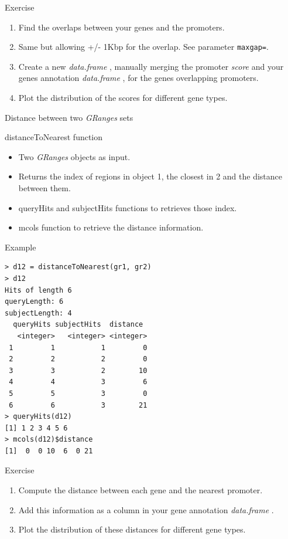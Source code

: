 \documentclass[10pt]{beamer}
\newcommand{\df}{{\it data.frame} }
\begin{document}
\begin{frame}[fragile]{Exercise}
  \begin{enumerate}
  \item Find the overlaps between your genes and the promoters.
  \item Same but allowing +/- 1Kbp for the overlap. See parameter \verb!maxgap=!.
    \bigskip
  \item Create a new \df,  manually merging the promoter {\it score} and your genes annotation \df, for the genes overlapping promoters.
  \item Plot the distribution of the scores for different gene types.
  \end{enumerate}
\end{frame}


\begin{frame}[fragile, shrink=30]{Distance between two {\it GRanges} sets}
  \begin{block}{{\sf distanceToNearest} function}
    \begin{itemize}
    \item Two {\it GRanges} objects as input.
    \item Returns the index of regions in object 1, the closest in 2 and the distance between them.
    \item {\sf queryHits} and {\sf subjectHits} functions to retrieves those index.
    \item {\sf mcols} function to retrieve the distance information.
    \end{itemize}
  \end{block}
  \begin{exampleblock}{Example}
\begin{verbatim}
> d12 = distanceToNearest(gr1, gr2)
> d12
Hits of length 6
queryLength: 6
subjectLength: 4
  queryHits subjectHits  distance 
   <integer>   <integer> <integer> 
 1         1           1         0 
 2         2           2         0 
 3         3           2        10 
 4         4           3         6 
 5         5           3         0 
 6         6           3        21 
> queryHits(d12)
[1] 1 2 3 4 5 6
> mcols(d12)$distance
[1]  0  0 10  6  0 21
\end{verbatim}
  \end{exampleblock}
  
\end{frame}


\begin{frame}{Exercise}
  \begin{enumerate}
  \item Compute the distance between each gene and the nearest promoter.
  \item Add this information as a column in your gene annotation \df.
    \bigskip
  \item Plot the distribution of these distances for different gene types.
  \end{enumerate}
\end{frame}
\end{document}
